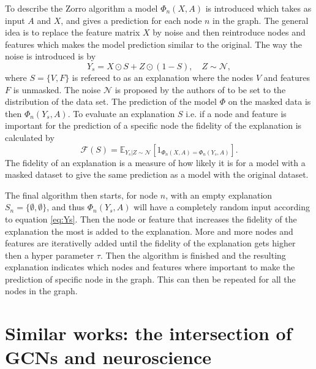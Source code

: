 To describe the Zorro algorithm a model $\Phi_n(X,A)$ is introduced which takes as input $A$ and $X$, and gives a prediction for each node $n$ in the graph. The general idea is to replace the feature matrix $X$ by noise and then reintroduce nodes and features which makes the model prediction similar to the original. The way the noise is introduced is by 
\begin{equation*}
    Y_s = X \odot S + Z \odot (1- S), \quad Z \sim \mathcal{N}, 
\end{equation*}
where $S = \{V, F\}$ is refereed to as an explanation where the nodes $V$ and features $F$ is unmasked. The noise $\mathcal{N}$ is proposed by the authors of \cite{} to be set to the distribution of the data set. The prediction of the model $\Phi$ on the masked data is then $\Phi_n(Y_s, A)$. To evaluate an explanation $S$ i.e. if a node and feature is important for the prediction of a specific node the fidelity of the explanation is calculated by
\begin{equation}\label{eq:Ys}
    \mathcal{F}(S) = \mathbb{E}_{Y_s|Z\sim\mathcal{N}}[1_{\Phi_n(X,A) = \Phi_n(Y_s,A)}].
\end{equation}
The fidelity of an explanation is a measure of how likely it is for a model with a masked dataset to give the same prediction as a model with the original dataset.


The final algorithm then starts, for node $n$, with an empty explanation $S_n = \{\emptyset, \emptyset\}$, and thus $\Phi_n(Y_s, A)$ will have a completely random input according to equation \ref{eq:Ys}. Then the node or feature that increases the fidelity of the explanation the most is added to the explanation. More and more nodes and features are iterativelly added until the fidelity of the explanation gets higher then a hyper parameter $\tau$. Then the algorithm is finished and the resulting explanation indicates which nodes and features where important to make the prediction of specific node in the graph. This can then be repeated for all the nodes in the graph.




\section{Similar works: the intersection of GCNs and neuroscience}

